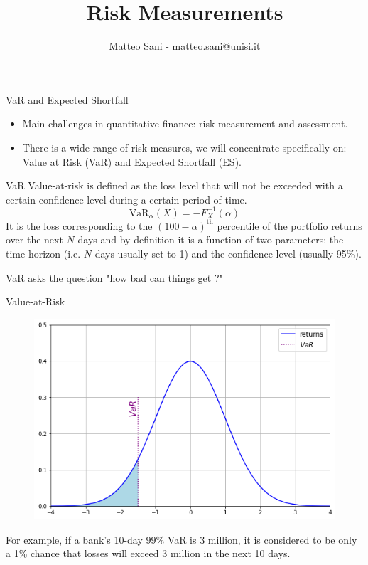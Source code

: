 \documentclass{beamer}
\title{Risk Measurements}
\author{Matteo Sani - \href{mailto:matteo.sani@unisi.it}{matteo.sani@unisi.it}}
\begin{document}
\begin{frame}[plain]
	\maketitle
\end{frame}

\begin{frame}{VaR and Expected Shortfall}
  \begin{itemize}
  \item Main challenges in quantitative finance: risk measurement and assessment.
  \item There is a wide range of risk measures, we will concentrate specifically on: Value at Risk (VaR) and Expected Shortfall (ES).
  \end{itemize}
  \begin{block}{VaR}
    Value-at-risk is defined as the loss level that will not be exceeded with a certain confidence level during a certain period of time.
    \begin{equation*}
      \textrm{VaR}_{\alpha}(X) = -F^{-1}_X(\alpha)
    \end{equation*}
It is the loss corresponding to the $(100-\alpha)^{\textrm{th}
}$ percentile of the portfolio returns over the next $N$ days and by definition it is a function of two parameters: the time horizon (i.e. $N$ days usually set to 1) and the confidence level (usually 95\%). 

VaR asks the question "how bad can things get ?"
\end{block}
\end{frame}

\begin{frame}{Value-at-Risk}
  \begin{figure}[h]
    \begin{center}
      \includegraphics[width=0.5\linewidth]{95_var}
    \end{center}
  \end{figure}
  For example, if a bank's 10-day 99\% VaR is 3 million, it is considered to be only a 1\% chance that losses will exceed 3 million in the next 10 days. 
\end{frame}
\end{document}
